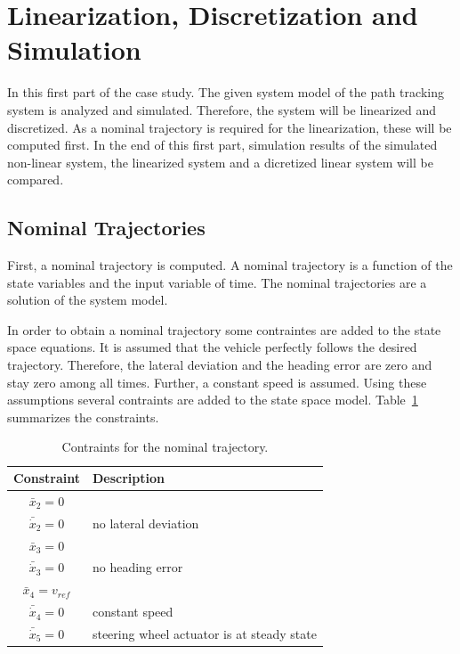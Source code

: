 
\section{Linearization, Discretization and Simulation}
In this first part of the case study. The given system model of the path tracking system is analyzed and simulated.
Therefore, the system will be linearized and discretized. 
As a nominal trajectory is required for the linearization, these will be computed first.
In the end of this first part, simulation results of the simulated non-linear system, the linearized system and a dicretized linear system will be compared.

\subsection{Nominal Trajectories}
First, a nominal trajectory is computed.
A nominal trajectory is a function of the state variables and the input variable of time.
The nominal trajectories are a solution of the system model.

In order to obtain a nominal trajectory some contraintes are added to the state space equations.
It is assumed that the vehicle perfectly follows the desired trajectory.
Therefore, the lateral deviation and the heading error are zero and stay zero among all times.
Further, a constant speed is assumed.
Using these assumptions several contraints are added to the state space model.
Table~\ref{tab:nominal_contraints} summarizes the constraints.
\begin{table}[h]
	\centering
	\begin{tabular}{c|l}
	\hline
	\hline
	\textbf{Constraint} & \textbf{Description}\\
	\hline
	$\bar{x}_2 = 0$\\$\bar{\dot{x}}_2 = 0$ & no lateral deviation\\\hline
	$\bar{x}_3 = 0$\\$\bar{\dot{x}}_3 = 0$& no heading error\\\hline
	$\bar{x}_4 = v_{ref}$\\$\bar{\dot{x}}_4 = 0$& constant speed\\\hline
	$\bar{\dot{x}}_5 = 0$ & steering wheel actuator is at steady state\\
	\hline
	\end{tabular}
	\caption{Contraints for the nominal trajectory.}
	\label{tab:nominal_contraints}
\end{table}

